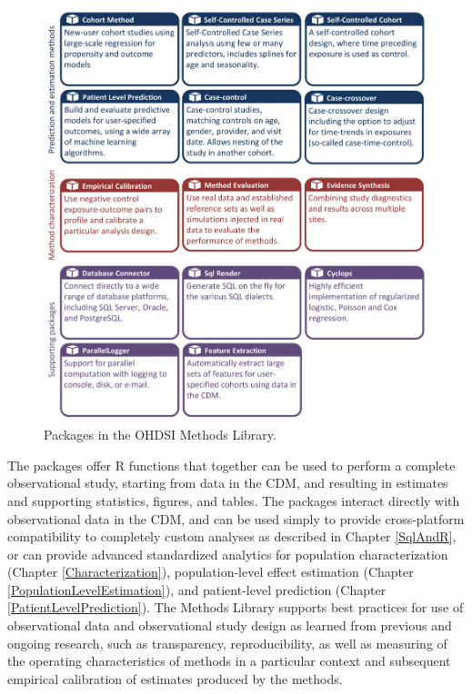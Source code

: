 \documentclass[11pt]{book}
\theoremstyle{definition}
\theoremstyle{definition}
\theoremstyle{definition}
\theoremstyle{remark}
\begin{document}
\begin{figure}

{\centering \includegraphics[width=1\linewidth]{images/OhdsiAnalyticsTools/methodsLibrary} 

}

\caption{Packages in the OHDSI Methods Library.}\label{fig:methodsLibrary}
\end{figure}

The packages offer R functions that together can be used to perform a
complete observational study, starting from data in the CDM, and
resulting in estimates and supporting statistics, figures, and tables.
The packages interact directly with observational data in the CDM, and
can be used simply to provide cross-platform compatibility to completely
custom analyses as described in Chapter \ref{SqlAndR}, or can provide
advanced standardized analytics for population characterization (Chapter
\ref{Characterization}), population-level effect estimation (Chapter
\ref{PopulationLevelEstimation}), and patient-level prediction (Chapter
\ref{PatientLevelPrediction}). The Methods Library supports best
practices for use of observational data and observational study design
as learned from previous and ongoing research, such as transparency,
reproducibility, as well as measuring of the operating characteristics
of methods in a particular context and subsequent empirical calibration
of estimates produced by the methods.
\end{document}
